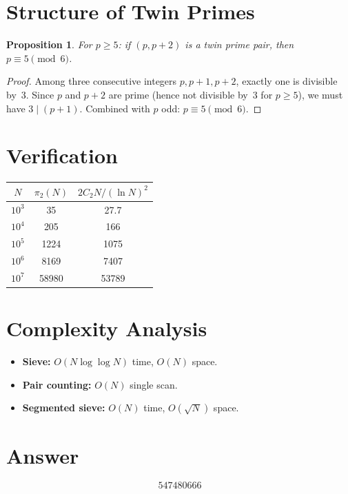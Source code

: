 \documentclass[11pt]{article}
\newtheorem{proposition}[theorem]{Proposition}
\begin{document}
\section{Structure of Twin Primes}

\begin{proposition}
For $p \ge 5$: if $(p, p+2)$ is a twin prime pair, then $p \equiv 5 \pmod{6}$.
\end{proposition}

\begin{proof}
Among three consecutive integers $p, p+1, p+2$, exactly one is divisible by~3. Since $p$ and $p+2$ are prime (hence not divisible by~3 for $p \ge 5$), we must have $3 \mid (p+1)$. Combined with $p$ odd: $p \equiv 5 \pmod{6}$.
\end{proof}

\section{Verification}

\begin{center}
\begin{tabular}{ccc}
\toprule
$N$ & $\pi_2(N)$ & $2C_2 N/(\ln N)^2$ \\
\midrule
$10^3$   & 35     & 27.7 \\
$10^4$   & 205    & 166 \\
$10^5$   & 1224   & 1075 \\
$10^6$   & 8169   & 7407 \\
$10^7$   & 58980  & 53789 \\
\bottomrule
\end{tabular}
\end{center}

\section{Complexity Analysis}

\begin{itemize}
\item \textbf{Sieve:} $O(N \log\log N)$ time, $O(N)$ space.
\item \textbf{Pair counting:} $O(N)$ single scan.
\item \textbf{Segmented sieve:} $O(N)$ time, $O(\sqrt{N})$ space.
\end{itemize}

\section{Answer}

\[
\boxed{547480666}
\]
\end{document}
